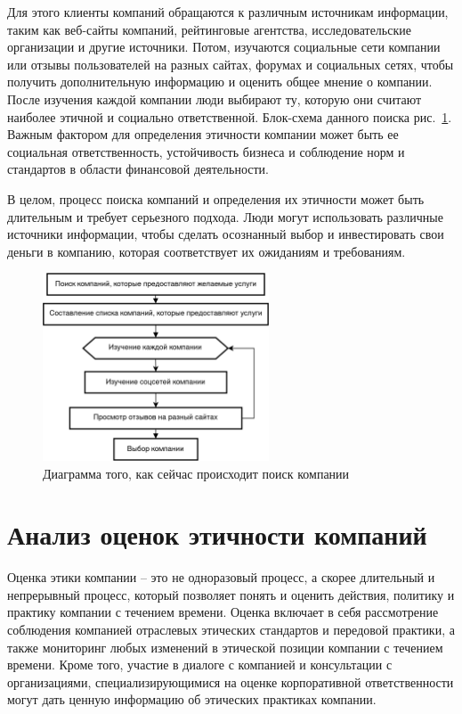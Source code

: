\documentclass[PI, VKR]{HSEUniversity}
\begin{document}
Для этого клиенты компаний обращаются к различным источникам информации, таким как веб-сайты компаний, рейтинговые агентства, исследовательские организации и другие источники. Потом, изучаются социальные сети компании или отзывы пользователей на разных сайтах, форумах и социальных сетях, чтобы получить дополнительную информацию и оценить общее мнение о компании. После изучения каждой компании люди выбирают ту, которую они считают наиболее этичной и социально ответственной. Блок-схема данного поиска рис.~\ref{fig:as_is}. Важным фактором для определения этичности компании может быть ее социальная ответственность, устойчивость бизнеса и соблюдение норм и стандартов в области финансовой деятельности.

В целом, процесс поиска компаний и определения их этичности может быть длительным и требует серьезного подхода. Люди могут использовать различные источники информации, чтобы сделать осознанный выбор и инвестировать свои деньги в компанию, которая соответствует их ожиданиям и требованиям.
\begin{figure}[h]
\centering
\includegraphics[width=0.6\textwidth]{img/mermaid/as_is_drawio.png}
\caption{\label{fig:as_is}Диаграмма того, как сейчас происходит поиск компании}
\end{figure}

\section{Анализ оценок этичности компаний}
\label{sec:orgc24e3f7}
Оценка этики компании -- это не одноразовый процесс, а скорее длительный и непрерывный процесс, который позволяет понять и оценить действия, политику и практику компании с течением времени. Оценка включает в себя рассмотрение соблюдения компанией отраслевых этических стандартов и передовой практики, а также мониторинг любых изменений в этической позиции компании с течением времени. Кроме того, участие в диалоге с компанией и консультации с организациями, специализирующимися на оценке корпоративной ответственности могут дать ценную информацию об этических практиках компании.
\end{document}
